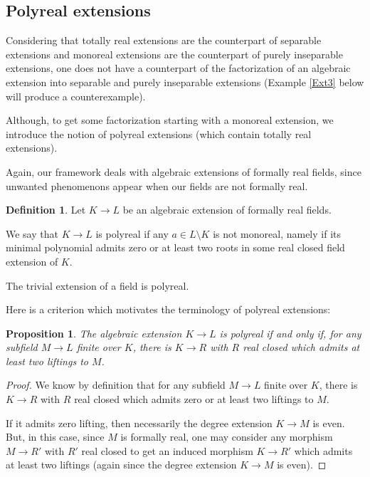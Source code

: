 \documentclass[12pt]{amsart}
\newtheorem{prop}[thm]{Proposition}
\theoremstyle{definition}
\newtheorem{defn}[thm]{Definition}
\begin{document}
 




\subsection{Polyreal extensions}
Considering that totally real extensions are the counterpart of separable extensions and monoreal  extensions are the counterpart of purely inseparable extensions, one does not have a counterpart of the factorization of an algebraic extension into separable and purely inseparable extensions (Example \ref{Ext3} below will produce a counterexample). 

Although, to get some factorization starting with a monoreal extension, we introduce the notion of polyreal extensions (which contain totally real extensions). 

Again, our framework deals with 
algebraic extensions of formally real fields, since unwanted phenomenons appear when our fields are not formally real. 


\begin{defn}
Let $K\to L$ be an algebraic extension of formally real fields. 

We say that $K\to L$ is polyreal if any
$a\in L\setminus K$ is not monoreal, namely if its minimal polynomial admits zero or at least two roots in some real closed field extension of $K$.
\end{defn}

 
The trivial extension of a field is polyreal.

Here is a criterion which motivates the terminology of polyreal extensions:
\begin{prop}\label{Antimonocriterion}
The algebraic extension $K\to L$ is polyreal 
if and only if, for any subfield $M\to L$ finite over $K$, there is $K\to R$ with $R$ real closed which admits at least two liftings to $M$.
\end{prop}
\begin{proof}
	We know by definition that for any subfield $M\to L$ finite over $K$, there is $K\to R$ with $R$ real closed which admits zero or at least two liftings to $M$.
	
	If it admits zero lifting, then necessarily the degree extension $K\to M$ is even. But, in this case, since $M$ is formally real, one may consider any morphism $M\to R'$ with $R'$ real closed to get an induced morphism $K\to R'$ which admits at least two liftings (again since the degree extension $K\to M$ is even).
\end{proof}	
\end{document}

